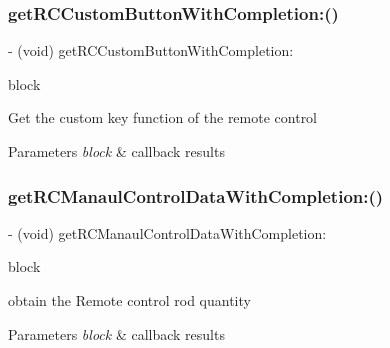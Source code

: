 \subsubsection{\texorpdfstring{get\+R\+C\+Custom\+Button\+With\+Completion\+:()}{getRCCustomButtonWithCompletion:()}}
{\footnotesize\ttfamily -\/ (void) get\+R\+C\+Custom\+Button\+With\+Completion\+: \begin{DoxyParamCaption}\item[{(void($^\wedge$)(P\+V\+Custom\+Button\+Function button\+Function, N\+S\+Error $\ast$\hyperlink{group___p_v_s_d_k___c_o_r_e___a_p_i___m_o_u_n_t_c_o_n_t_r_o_l_ga5a1de33b230662127568783314b4a54d}{\+\_\+\+Nullable} error))}]{block }\end{DoxyParamCaption}}

Get the custom key function of the remote control


\begin{DoxyParams}{Parameters}
{\em block} & callback results \\
\hline
\end{DoxyParams}
\mbox{\label{interface_p_v_remote_controller_acf9aa5c3ed70d98e3c0ee38eeeb3487c}} 
\subsubsection{\texorpdfstring{get\+R\+C\+Manaul\+Control\+Data\+With\+Completion\+:()}{getRCManaulControlDataWithCompletion:()}}
{\footnotesize\ttfamily -\/ (void) get\+R\+C\+Manaul\+Control\+Data\+With\+Completion\+: \begin{DoxyParamCaption}\item[{(void($^\wedge$)(\hyperlink{struct_p_v_romote_calibrate_data}{P\+V\+Romote\+Calibrate\+Data} data, N\+S\+Error $\ast$\hyperlink{group___p_v_s_d_k___c_o_r_e___a_p_i___m_o_u_n_t_c_o_n_t_r_o_l_ga5a1de33b230662127568783314b4a54d}{\+\_\+\+Nullable} error))}]{block }\end{DoxyParamCaption}}

obtain the Remote control rod quantity


\begin{DoxyParams}{Parameters}
{\em block} & callback results \\
\hline
\end{DoxyParams}
\mbox{\label{interface_p_v_remote_controller_a2a64b9e47b1b5899f0ba83c62187b9b7}} 
